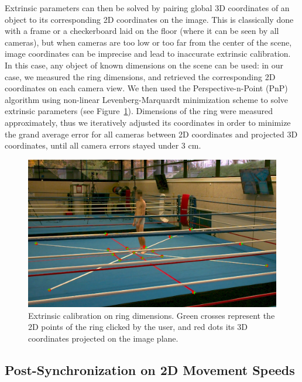 \newpage
Extrinsic parameters can then be solved by pairing global 3D coordinates of an object to its corresponding 2D coordinates on the image. This is classically done with a frame or a checkerboard laid on the floor (where it can be seen by all cameras), but when cameras are too low or too far from the center of the scene, image coordinates can be imprecise and lead to inaccurate extrinsic calibration. In this case, any object of known dimensions on the scene can be used: in our case, we measured the ring dimensions, and retrieved the corresponding 2D coordinates on each camera view. We then used the Perspective-n-Point (PnP) algorithm using non-linear Levenberg-Marquardt minimization scheme \cite{More1978} to solve extrinsic parameters \cite{Marchand2015} (see Figure~\ref{fig_calib}). Dimensions of the ring were measured approximately, thus we iteratively adjusted its coordinates in order to minimize the grand average error for all cameras between 2D coordinates and projected 3D coordinates, until all camera errors stayed under 3 cm. 

\begin{figure}[!ht]
	\centering
	\def\svgwidth{1\columnwidth}
	\fontsize{10pt}{10pt}\selectfont
	\includegraphics[width=\linewidth]{"../Chap6/Figures/Fig_Calib.png"}
	\caption{Extrinsic calibration on ring dimensions. Green crosses represent the 2D points of the ring clicked by the user, and red dots its 3D coordinates projected on the image plane.}
	\label{fig_calib}
\end{figure}


\subsection{Post-Synchronization on 2D Movement Speeds}


